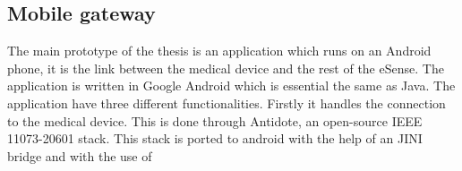 
\subsection{Mobile gateway}
\label{sub:mobilegateway}
The main prototype of the thesis is an application which runs on an Android phone, it is the link between the medical device and the rest of the eSense. The application is written in Google Android which is essential the same as Java. The application have three different functionalities. Firstly it handles the connection to the medical device. This is done through Antidote, an open-source IEEE 11073-20601 stack. This stack is ported to android with the help of an JINI bridge and with the use of 